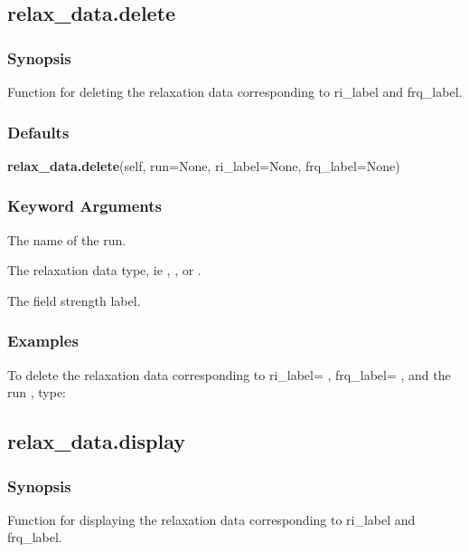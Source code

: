 \subsection{relax\_data.delete}


\subsubsection{Synopsis}

Function for deleting the relaxation data corresponding to ri\_label and frq\_label.

\subsubsection{Defaults}

\textsf{\textbf{relax\_data.delete}(self, run=None, ri\_label=None, frq\_label=None)}


\subsubsection{Keyword Arguments}


  The name of the run.

  The relaxation data type, ie 
, 
, or 
.

  The field strength label.

\subsubsection{Examples}

To delete the relaxation data corresponding to ri\_label=
, frq\_label=
, and the run
, type:




\newpage

\subsection{relax\_data.display}


\subsubsection{Synopsis}

Function for displaying the relaxation data corresponding to ri\_label and frq\_label.

